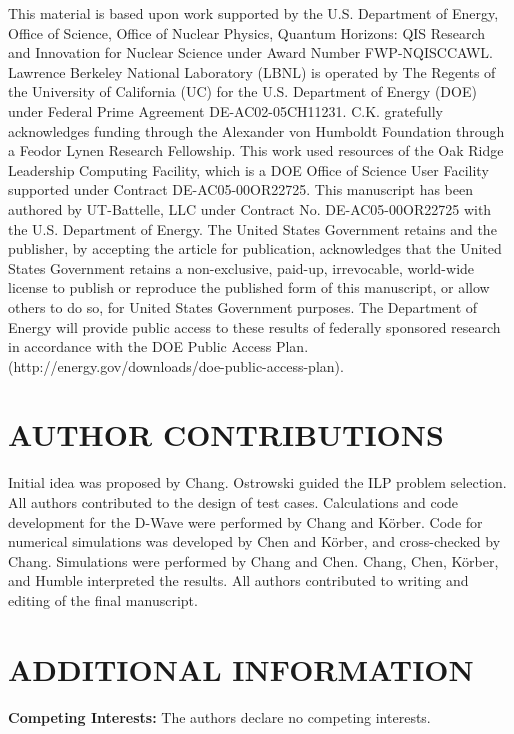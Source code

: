 \documentclass[prd,twocolumn,tightenlines,preprintnumbers,showpacs,superscriptaddress,notitlepage,nofootinbib,eqsecnum,floatfix,longbibliography,aps,10pt]{revtex4-2}
\begin{document}
This material is based upon work supported by the U.S. Department of Energy, Office of Science, Office of Nuclear Physics, Quantum Horizons: QIS Research and Innovation for Nuclear Science under Award Number FWP-NQISCCAWL.
Lawrence Berkeley National Laboratory (LBNL) is operated by The Regents of the University of California (UC) for the U.S. Department of Energy (DOE) under Federal Prime Agreement DE-AC02-05CH11231.
C.K. gratefully acknowledges funding through the Alexander von Humboldt Foundation through a Feodor Lynen Research Fellowship.
This work used resources of the Oak Ridge Leadership Computing Facility, which is a DOE Office of Science User Facility supported under Contract DE-AC05-00OR22725.
This manuscript has been authored by UT-Battelle, LLC under Contract No. DE-AC05-00OR22725 with the U.S. Department of Energy.
The United States Government retains and the publisher, by accepting the article for publication, acknowledges that the United States Government retains a non-exclusive, paid-up, irrevocable, world-wide license to publish or reproduce the published form of this manuscript, or allow others to do so, for United States Government purposes. The Department of Energy will provide public access to these results of federally sponsored research in accordance with the DOE Public Access Plan. (http://energy.gov/downloads/doe-public-access-plan).


\section{AUTHOR CONTRIBUTIONS}

Initial idea was proposed by Chang.
Ostrowski guided the ILP problem selection.
All authors contributed to the design of test cases.
Calculations and code development for the D-Wave were performed by Chang and K\"orber.
Code for numerical simulations was developed by Chen and K\"orber, and cross-checked by Chang.
Simulations were performed by Chang and Chen.
Chang, Chen, K\"orber, and Humble interpreted the results.
All authors contributed to writing and editing of the final manuscript.

\section{ADDITIONAL INFORMATION}

\textbf{Competing Interests:} The authors declare no competing interests.



\end{document}
